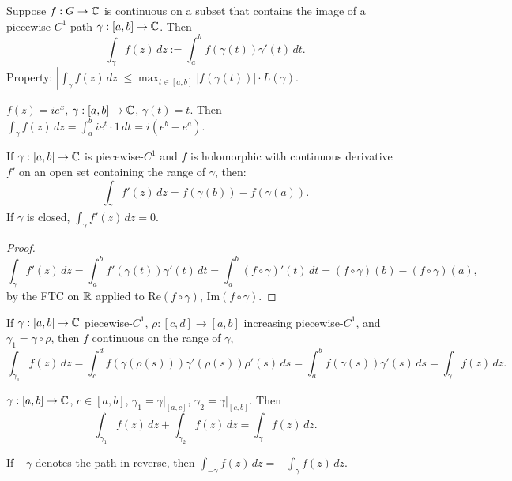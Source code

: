 \documentclass[11pt]{article}
\begin{document}
\begin{definition}
Suppose $f: G \to {\mathbb{C}}$ is continuous on a subset that contains the image of a piecewise-$C^1$ path $\gamma:[a,b] \to {\mathbb{C}}$. Then
\[
\int_\gamma f(z) \, dz := \int_a^b f(\gamma(t)) \gamma'(t) \, dt.
\]
Property: $\left| \int_\gamma f(z) \, dz \right| \le \max_{t \in [a,b]} |f(\gamma(t))| \cdot L(\gamma)$.
\end{definition}

\begin{example}
$f(z) = ie^x$, $\gamma:[a,b]\to{\mathbb{C}}$, $\gamma(t) = t$. Then $\int_\gamma f(z)\,dz = \int_a^b ie^t\cdot 1\,dt = i(e^b-e^a)$.
\end{example}

\begin{theorem}
If $\gamma:[a,b]\to{\mathbb{C}}$ is piecewise-$C^1$ and $f$ is holomorphic with continuous derivative $f'$ on an open set containing the range of $\gamma$, then:
\[
\int_\gamma f'(z) \, dz = f(\gamma(b)) - f(\gamma(a)).
\]
If $\gamma$ is closed, $\int_\gamma f'(z) \, dz = 0$.
\end{theorem}

\begin{proof}
\[
\int_\gamma f'(z)\,dz = \int_a^b f'(\gamma(t))\gamma'(t)\,dt = \int_a^b (f\circ\gamma)'(t)\,dt = (f\circ\gamma)(b) - (f\circ\gamma)(a),
\]
by the FTC on ${\mathbb{R}}$ applied to $\mathrm{Re}(f\circ\gamma)$, $\mathrm{Im}(f\circ\gamma)$.
\end{proof}

\begin{proposition}
If $\gamma:[a,b]\to{\mathbb{C}}$ piecewise-$C^1$, $\rho:[c,d]\to[a,b]$ increasing piecewise-$C^1$, and $\gamma_1 = \gamma\circ\rho$, then $f$ continuous on the range of $\gamma$,
\[
\int_{\gamma_1} f(z)\,dz = \int_c^d f(\gamma(\rho(s)))\gamma'(\rho(s))\rho'(s)\,ds = \int_a^b f(\gamma(s))\gamma'(s)\,ds = \int_\gamma f(z)\,dz.
\]
\end{proposition}

\begin{proposition}[Additivity]
$\gamma:[a,b]\to{\mathbb{C}}$, $c \in [a,b]$, $\gamma_1 = \gamma|_{[a,c]}$, $\gamma_2 = \gamma|_{[c,b]}$. Then
\[
\int_{\gamma_1} f(z)\,dz + \int_{\gamma_2} f(z)\,dz = \int_\gamma f(z)\,dz.
\]
\end{proposition}

\begin{proposition}[Reversal]
If $-\gamma$ denotes the path in reverse, then $\int_{-\gamma} f(z)\,dz = -\int_\gamma f(z)\,dz$.
\end{proposition}
\end{document}
